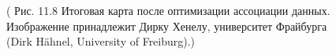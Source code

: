 \documentclass[10pt,a4paper]{article}
\begin{document}
\begin{figure}[H]
	\caption{ ( Рис. 11.8 Итоговая карта после оптимизации ассоциации данных. Изображение принадлежит Дирку Хенелу, университет Фрайбурга (Dirk Hähnel, University of Freiburg).) }
	\label{fig:118orig}
\end{figure}
\end{document}
